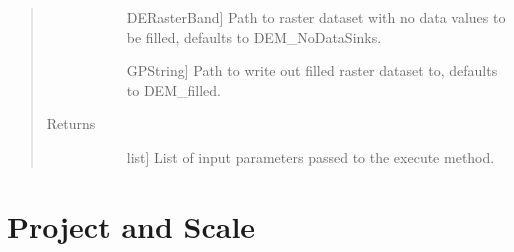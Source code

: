 \documentclass[letterpaper,10pt,english]{sphinxmanual}
\begin{document}
\begin{fulllineitems}
\begin{fulllineitems}
\begin{quote}
\begin{description}
\begin{description}
\item[{}] \leavevmode{[}DERasterBand{]}
Path to raster dataset with no data values to be filled, defaults to DEM\_NoDataSinks.

\item[{}] \leavevmode{[}GPString{]}
Path to write out filled raster dataset to, defaults to DEM\_filled.

\end{description}

\item[{Returns}] \leavevmode\begin{description}
\item[{}] \leavevmode{[}list{]}
List of input parameters passed to the execute method.

\end{description}

\end{description}\end{quote}

\end{fulllineitems}


\end{fulllineitems}



\section{Project and Scale}
\label{\detokenize{StreamStats_DataPrep:project-and-scale}}
\end{document}
